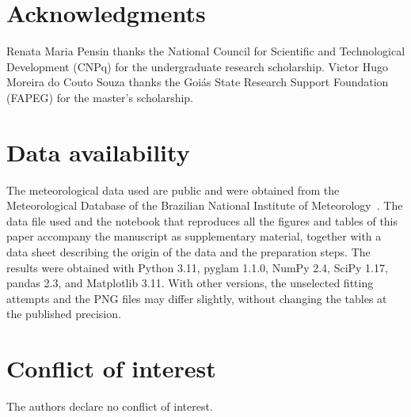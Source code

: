 \section*{Acknowledgments}
Renata Maria Pensin thanks the National Council for Scientific and Technological Development (CNPq) for the undergraduate research scholarship. Victor Hugo Moreira do Couto Souza thanks the Goiás State Research Support Foundation (FAPEG) for the master's scholarship.

\section*{Data availability}
The meteorological data used are public and were obtained from the Meteorological Database of the Brazilian National Institute of Meteorology~\cite{inmet2025}. The data file used and the notebook that reproduces all the figures and tables of this paper accompany the manuscript as supplementary material, together with a data sheet describing the origin of the data and the preparation steps. The results were obtained with Python 3.11, pyglam 1.1.0, NumPy 2.4, SciPy 1.17, pandas 2.3, and Matplotlib 3.11. With other versions, the unselected fitting attempts and the PNG files may differ slightly, without changing the tables at the published precision.

\section*{Conflict of interest}
The authors declare no conflict of interest.
